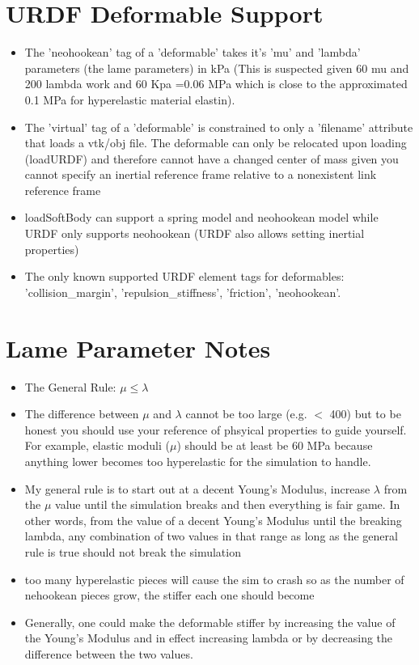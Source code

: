 \documentclass{article}
\begin{document}
\section{URDF Deformable Support}
\begin{itemize}
    \item The 'neohookean' tag of a 'deformable' takes it's 'mu' and 'lambda' parameters (the lame parameters) in kPa (This is suspected given 60 mu and 200 lambda work and 60 Kpa =0.06 MPa which is close to the approximated 0.1 MPa for hyperelastic material elastin).
    \item The 'virtual' tag of a 'deformable' is constrained to only a 'filename' attribute that loads a vtk/obj file. The deformable can only be relocated upon loading (loadURDF) and therefore cannot have a changed center of mass given you cannot specify an inertial reference frame relative to a nonexistent link reference frame
    \item loadSoftBody can support a spring model and neohookean model while URDF only supports neohookean (URDF also allows setting inertial properties)
    \item The only known supported URDF element tags for deformables: 'collision\_margin', 'repulsion\_stiffness', 'friction', 'neohookean'.
\end{itemize}

\section{Lame Parameter Notes}
\begin{itemize}
    \item The General Rule: $\mu \leq \lambda$
    \item The difference between $\mu$ and $\lambda$ cannot be too large (e.g. $<$ 400) but to be honest you should use your reference of phsyical properties to guide yourself. For example,
    elastic moduli ($\mu$) should be at least be 60 MPa because anything lower becomes too hyperelastic for the simulation to handle.
    \item My general rule is to start out at a decent Young's Modulus, increase $\lambda$ from the $\mu$ value until the simulation breaks and then everything
    is fair game. In other words, from the value of a decent Young's Modulus until the breaking lambda, any combination of two values in that range as long as the general rule is true should not break the simulation
    \item too many hyperelastic pieces will cause the sim to crash so as the number of nehookean pieces grow, the stiffer each one should become
    \item Generally, one could make the deformable stiffer by increasing the value of the Young's Modulus
          and in effect increasing lambda or by decreasing the difference between the two values.
\end{itemize}
\end{document}
